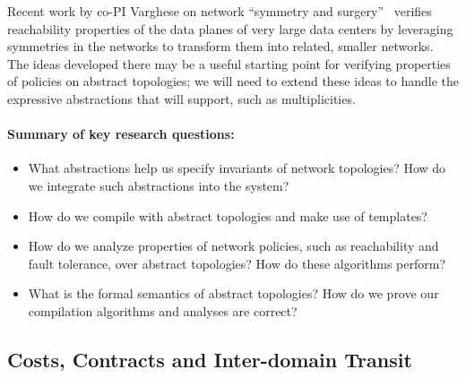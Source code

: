 Recent work by co-PI Varghese on network ``symmetry and surgery''~\cite{bjorner+:scaling-network-verification} verifies reachability properties of the data planes of very large
data centers by leveraging symmetries in the networks to  
transform them into
related, smaller networks.  The ideas
developed there may be a useful starting point for verifying properties of \Name policies on abstract topologies; we will need to extend these ideas to handle the expressive abstractions that \Name will support, such as multiplicities.  


\paragraph*{Summary of key research questions:}

\begin{itemize}
\item What abstractions help us specify invariants of network topologies? How do we integrate such abstractions into the \Name system?
\item How do we compile with abstract topologies and make use of templates?  
\item How do we analyze properties of network policies, such as
reachability and fault tolerance, over abstract
topologies?  How do these algorithms perform?
\item What is the formal 
semantics of abstract topologies?  How do we prove our
compilation algorithms and analyses are correct?
\end{itemize}

\subsection{Costs, Contracts and Inter-domain Transit}

